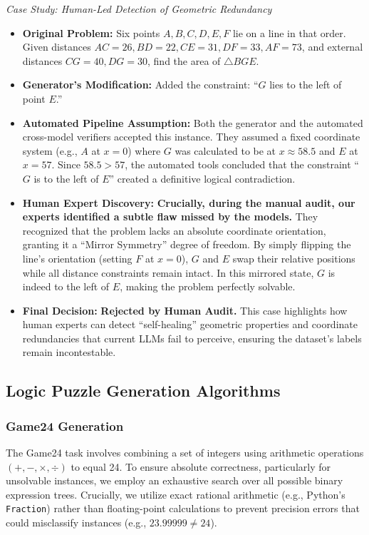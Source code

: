 \vspace{0.5em}
\noindent\textit{Case Study: Human-Led Detection of Geometric Redundancy}
\begin{itemize}[leftmargin=1.5em, itemsep=0.2em]
    \item \textbf{Original Problem:} Six points $A, B, C, D, E, F$ lie on a line in that order. Given distances $AC=26, BD=22, CE=31, DF=33, AF=73$, and external distances $CG=40, DG=30$, find the area of $\triangle BGE$.
    \item \textbf{Generator's Modification:} Added the constraint: ``$G$ lies to the left of point $E$.''
    \item \textbf{Automated Pipeline Assumption:} Both the generator and the automated cross-model verifiers accepted this instance. They assumed a fixed coordinate system (e.g., $A$ at $x=0$) where $G$ was calculated to be at $x \approx 58.5$ and $E$ at $x=57$. Since $58.5 > 57$, the automated tools concluded that the constraint ``$G$ is to the left of $E$'' created a definitive logical contradiction.
    \item \textbf{Human Expert Discovery:} \textbf{Crucially, during the manual audit, our experts identified a subtle flaw missed by the models.} They recognized that the problem lacks an absolute coordinate orientation, granting it a ``Mirror Symmetry'' degree of freedom. By simply flipping the line's orientation (setting $F$ at $x=0$), $G$ and $E$ swap their relative positions while all distance constraints remain intact. In this mirrored state, $G$ is indeed to the left of $E$, making the problem perfectly solvable.
    \item \textbf{Final Decision:} \textbf{Rejected by Human Audit.} This case highlights how human experts can detect ``self-healing'' geometric properties and coordinate redundancies that current LLMs fail to perceive, ensuring the dataset's labels remain incontestable.
\end{itemize}

\subsection{Logic Puzzle Generation Algorithms}

\subsubsection{Game24 Generation}
The Game24 task involves combining a set of integers using arithmetic operations $(+, -, \times, \div)$ to equal 24. To ensure absolute correctness, particularly for unsolvable instances, we employ an exhaustive search over all possible binary expression trees. Crucially, we utilize exact rational arithmetic (e.g., Python's \texttt{Fraction}) rather than floating-point calculations to prevent precision errors that could misclassify instances (e.g., $23.99999 \neq 24$).

